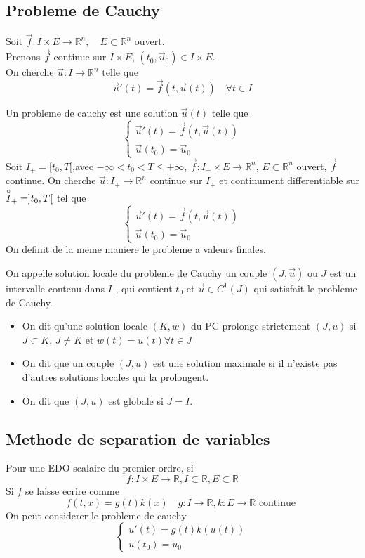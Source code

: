 \documentclass[../main.tex]{subfiles}
\begin{document}
\subsection{Probleme de Cauchy}
Soit $\vec{f}: I \times E \to \mathbb{R}^n ,\quad E \subset \mathbb{R}^n$ ouvert.\\
Prenons $\vec{f}$ continue sur $I \times E$, $( t_0,\vec{u}_0) \in I \times E$.\\
On cherche $\vec{u}:I \to \mathbb{R}^n$ telle que 
\[ 
	\vec{u}'( t) = \vec{f}( t,\vec{u}( t) ) \quad \forall t \in I
\]

Un probleme de cauchy est une solution $\vec{u}( t) $ telle que
\[ 
\begin{cases}
	\vec{u}'( t) = \vec{f}( t,\vec{u}( t) ) \\
	\vec{u}( t_0) = \vec{u}_0
\end{cases}
\]
Soit $I_+ = [ t_0,T[ $,avec $- \infty < t_0 < T \leq + \infty $, $\vec{f}: I_+ \times E \to \mathbb{R}^n$, $E \subset \mathbb{R}^n$ ouvert, $\vec{f}$ continue. On cherche $\vec{u}: I_+ \to \mathbb{R}^n$ continue sur $I_+$ et continument differentiable sur $\overset{\circ}{I}_+ = ]t_0,T[$ tel que
\[ 
\begin{cases}
	\vec{u}'( t) = \vec{f}( t,\vec{u}( t) ) \\
	\vec{u}( t_0) = \vec{u}_0
\end{cases}
\]
On definit de la meme maniere le probleme a valeurs finales.
\begin{defn}
	On appelle solution locale du probleme de Cauchy un couple $( J, \vec{u}) $ ou $J$ est un intervalle contenu dans $I$ , qui contient $t_0$ et $\vec{u} \in C^{1}( J) $ qui satisfait le probleme de Cauchy.
	\begin{itemize}
		\item On dit qu'une solution locale $( K,w) $ du PC prolonge strictement $( J,u) $ si $J \subset K $, $J \neq K$ et $w( t) = u( t) \forall t \in J$
		\item On dit que un couple $( J,u )$ est une solution maximale si il n'existe pas d'autres solutions locales qui la prolongent.
		\item On dit que $( J,u) $ est globale si $J=I$.
	\end{itemize}
	
\end{defn}
\subsection{Methode de separation de variables}
Pour une EDO scalaire du premier ordre, si
\[ 
f: I \times E \to \mathbb{R}, I \subset \mathbb{R}, E \subset \mathbb{R}
\]
Si $f$ se laisse ecrire comme
\[ 
	f( t,x) = g( t) k( x) \quad g: I \to \mathbb{R}, k : E \to \mathbb{R} \text{ continue } 
\]
On peut considerer le probleme de cauchy
\[ 
\begin{cases}
	u'( t) = g( t) k( u( t) ) \\
	u( t_0) = u_0
\end{cases}
\]
\end{document}
